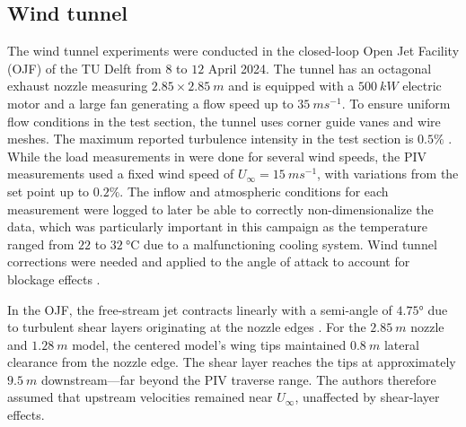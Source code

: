\documentclass[wes, manuscript]{copernicus}
\begin{document}
\subsection{Wind tunnel}
%
The wind tunnel experiments were conducted in the closed-loop Open Jet Facility (OJF) of the TU Delft from $8$ to $12$ April 2024. The tunnel has an octagonal exhaust nozzle measuring $2.85 \times2.85~\unit{m}$ and is equipped with a $500~\unit{kW}$ electric motor and a large fan generating a flow speed up to $35~\unit{m s^{-1}}$. To ensure uniform flow conditions in the test section, the tunnel uses corner guide vanes and wire meshes. The maximum reported turbulence intensity in the test section is $0.5\%$ \citep{Lignarolo2014}. While the load measurements in \citep{Poland2025a} were done for several wind speeds, the PIV measurements used a fixed wind speed of $U_\infty = 15~\unit{m s^{-1}}$, with variations from the set point up to $0.2\%$. The inflow and atmospheric conditions for each measurement were logged to later be able to correctly non-dimensionalize the data, which was particularly important in this campaign as the temperature ranged from $22$ to $32~\unit{\degree}\text{C}$ due to a malfunctioning cooling system. Wind tunnel corrections were needed and applied to the angle of attack to account for blockage effects \citep{Poland2025a}.

In the OJF, the free-stream jet contracts linearly with a semi-angle of $4.75\unit{\degree}$ due to turbulent shear layers originating at the nozzle edges \citep{Lignarolo2014}. For the $2.85~\unit{m}$ nozzle and $1.28~\unit{m}$ model, the centered model's wing tips maintained $0.8~\unit{m}$ lateral clearance from the nozzle edge. The shear layer reaches the tips at approximately $9.5~\unit{m}$ downstream—far beyond the PIV traverse range. The authors therefore assumed that upstream velocities remained near $U_{\infty}$, unaffected by shear-layer effects.
%
\end{document}
